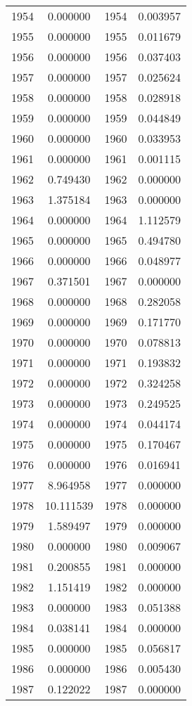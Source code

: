 \documentclass[12pt]{article}
\begin{document}
\begin{longtable}{@{}cccc@{}}
1954 & 0.000000 & 1954 & 0.003957 \\
1955 & 0.000000 & 1955 & 0.011679 \\
1956 & 0.000000 & 1956 & 0.037403 \\
1957 & 0.000000 & 1957 & 0.025624 \\
1958 & 0.000000 & 1958 & 0.028918 \\
1959 & 0.000000 & 1959 & 0.044849 \\
1960 & 0.000000 & 1960 & 0.033953 \\
1961 & 0.000000 & 1961 & 0.001115 \\
1962 & 0.749430 & 1962 & 0.000000 \\
1963 & 1.375184 & 1963 & 0.000000 \\
1964 & 0.000000 & 1964 & 1.112579 \\
1965 & 0.000000 & 1965 & 0.494780 \\
1966 & 0.000000 & 1966 & 0.048977 \\
1967 & 0.371501 & 1967 & 0.000000 \\
1968 & 0.000000 & 1968 & 0.282058 \\
1969 & 0.000000 & 1969 & 0.171770 \\
1970 & 0.000000 & 1970 & 0.078813 \\
1971 & 0.000000 & 1971 & 0.193832 \\
1972 & 0.000000 & 1972 & 0.324258 \\
1973 & 0.000000 & 1973 & 0.249525 \\
1974 & 0.000000 & 1974 & 0.044174 \\
1975 & 0.000000 & 1975 & 0.170467 \\
1976 & 0.000000 & 1976 & 0.016941 \\
1977 & 8.964958 & 1977 & 0.000000 \\
1978 & 10.111539 & 1978 & 0.000000 \\
1979 & 1.589497 & 1979 & 0.000000 \\
1980 & 0.000000 & 1980 & 0.009067 \\
1981 & 0.200855 & 1981 & 0.000000 \\
1982 & 1.151419 & 1982 & 0.000000 \\
1983 & 0.000000 & 1983 & 0.051388 \\
1984 & 0.038141 & 1984 & 0.000000 \\
1985 & 0.000000 & 1985 & 0.056817 \\
1986 & 0.000000 & 1986 & 0.005430 \\
1987 & 0.122022 & 1987 & 0.000000 \\

\end{longtable}
\end{document}
